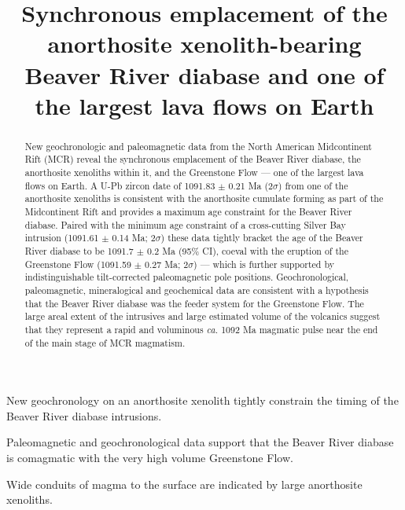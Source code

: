 \documentclass[draft]{agujournal2019}
\begin{document}
\title{Synchronous emplacement of the anorthosite xenolith-bearing Beaver River diabase and one of the largest lava flows on Earth}





\begin{keypoints}
\item New geochronology on an anorthosite xenolith tightly constrain the timing of the Beaver River diabase intrusions.
\item Paleomagnetic and geochronological data support that the Beaver River diabase is comagmatic with the very high volume Greenstone Flow. 
\item Wide conduits of magma to the surface are indicated by large anorthosite xenoliths.
\end{keypoints}


\begin{abstract}
New geochronologic and paleomagnetic data from the North American Midcontinent Rift (MCR) reveal the synchronous emplacement of the Beaver River diabase, the anorthosite xenoliths within it, and the Greenstone Flow --- one of the largest lava flows on Earth. A U-Pb zircon date of 1091.83 $\pm$ 0.21 Ma (2$\sigma$) from one of the anorthosite xenoliths is consistent with the anorthosite cumulate forming as part of the Midcontinent Rift and provides a maximum age constraint for the Beaver River diabase. Paired with the minimum age constraint of a cross-cutting Silver Bay intrusion (1091.61 $\pm$ 0.14 Ma; 2$\sigma$) these data tightly bracket the age of the Beaver River diabase to be 1091.7 $\pm$ 0.2 Ma (95\% CI), coeval with the eruption of the Greenstone Flow (1091.59 $\pm$ 0.27 Ma; 2$\sigma$) --- which is further supported by indistinguishable tilt-corrected paleomagnetic pole positions. Geochronological, paleomagnetic, mineralogical and geochemical data are consistent with a hypothesis that the Beaver River diabase was the feeder system for the Greenstone Flow. The large areal extent of the intrusives and large estimated volume of the volcanics suggest that they represent a rapid and voluminous \textit{ca.} 1092 Ma magmatic pulse near the end of the main stage of MCR magmatism.
\end{abstract}
\end{document}
